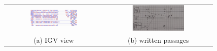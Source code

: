 \begin{figure}[H]
\begin{tabular}{cc}
  \includegraphics[width=0.5\textwidth]{pos3.PNG} &   \includegraphics[width=0.5\textwidth]{pos3passages.jpg} \\
(a) IGV view & (b) written passages \\[6pt]
\end{tabular}
\caption{}
\label{fig:ex_3}
\end{figure}


